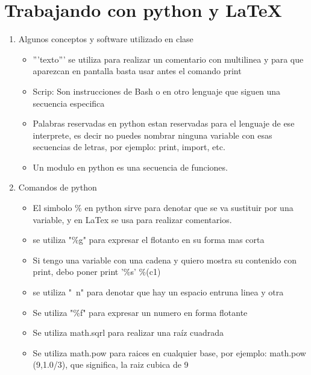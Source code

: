 \documentclass{book}
\begin{document}

\section{Trabajando con python y LaTeX}%
\begin{flushright}
	\date{11 de enero de 2019}
\end{flushright}

\begin{enumerate}%
	\item Algunos conceptos y software utilizado en clase%
	\begin{itemize}
		\item '''texto''' se utiliza para realizar un comentario con multilinea y para que aparezcan en pantalla basta usar antes el comando print 			
		\item Scrip: Son instrucciones de Bash o en otro lenguaje que siguen una secuencia especifica			
		\item Palabras reservadas en python estan reservadas para el lenguaje de ese interprete, es decir no puedes nombrar ninguna variable con esas secuencias de letras, por ejemplo: print, import, etc.
		\item Un modulo en python es una secuencia de funciones.
	\end{itemize}
	
	\item Comandos de python%
	\begin{itemize}%
		\item El simbolo \% en python sirve para denotar que se va sustituir por una variable, y en LaTex se usa para realizar comentarios.
		\item se utiliza "\%g" para expresar el flotanto en su forma mas corta
		\item Si tengo una variable con una cadena y quiero mostra su contenido con print, debo poner print '\%s' \%(c1)
		\item se utiliza "\ n" para denotar que hay un espacio entruna linea y otra
		\item Se utiliza "\%f" para expresar un numero en forma flotante
		\item Se utiliza math.sqrl para realizar una raíz cuadrada
		\item Se utiliza math.pow para raices en cualquier base, por ejemplo: math.pow (9,1.0/3), que significa, la raiz cubica de 9
		

\end{itemize}
\end{enumerate}
\end{document}
